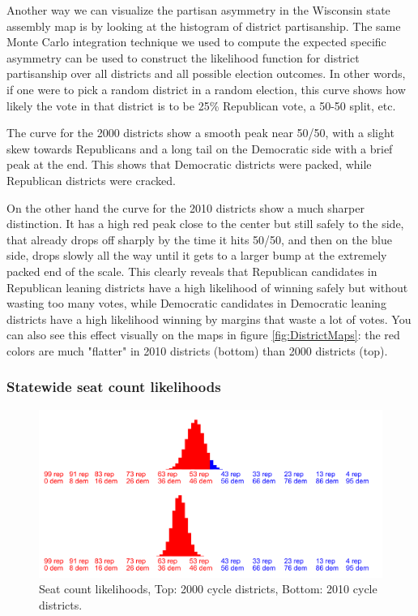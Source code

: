 \documentclass[preprint,12pt]{article}
\begin{document}
Another way we can visualize the partisan asymmetry in the Wisconsin state assembly map is by looking at the histogram of district partisanship.
The same Monte Carlo integration technique we used to compute the expected specific asymmetry can be used to construct the likelihood function for district partisanship over all districts and all possible election outcomes.
In other words, if one were to pick a random district in a random election, this curve shows how likely the vote in that district is to be 25\% Republican vote, a 50-50 split, etc.
 
The curve for the 2000 districts show a smooth peak near 50/50, with a slight skew towards Republicans and a long tail on the Democratic side with a brief peak at the end.  
This shows that Democratic districts were packed, while Republican districts were cracked.

On the other hand the curve for the 2010 districts show a much sharper distinction.
It has a high red peak close to the center but still safely to the side, that already drops off sharply by the time it hits 50/50, and then on the blue side, drops slowly all the way until it gets to a larger bump at the extremely packed end of the scale.
This clearly reveals that Republican candidates in Republican leaning districts have a high likelihood of winning safely but without wasting too many votes, while Democratic candidates in Democratic leaning districts have a high likelihood winning by margins that waste a lot of votes.
You can also see this effect visually on the maps in figure \ref{fig:DistrictMaps}: the red colors are much "flatter" in 2010 districts (bottom) than 2000 districts (top).

\subsubsection{Statewide seat count likelihoods}

\begin{figure}[htb!]
    \begin{center}
        \includegraphics[scale=0.25]{../Figures/WI_compared/seats_cropped.png}
        \caption{Seat count likelihoods, Top: 2000 cycle districts, Bottom: 2010 cycle districts.}\label{fig:LikelihoodsSeatCounts}
    \end{center}
\end{figure}
 
\end{document}
